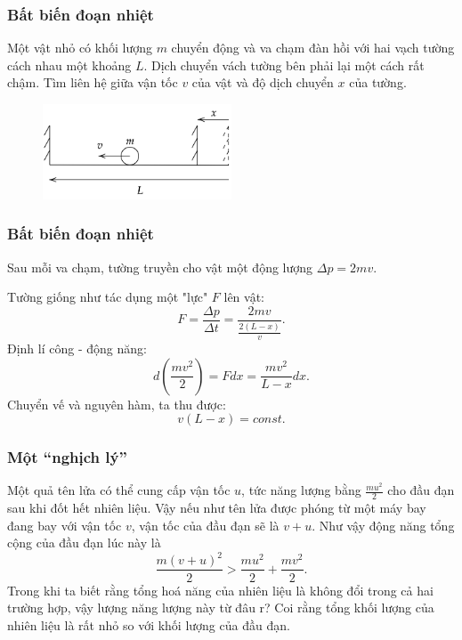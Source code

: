 \begin{frame}
\frametitle{Bất biến đoạn nhiệt}
Một vật nhỏ có khối lượng \(m\) chuyển động và va chạm đàn hồi với hai vạch tường cách nhau một khoảng \(L\). Dịch chuyển vách tường bên phải lại một cách rất chậm. Tìm liên hệ giữa vận tốc \(v\) của vật và độ dịch chuyển \(x\) của tường.
\begin{figure}
    \centering
    \includegraphics[width=0.5\textwidth]{Content/Figure/adiabatic.png}
\end{figure}
\end{frame}

\begin{frame}
\frametitle{Bất biến đoạn nhiệt}
Sau mỗi va chạm, tường truyền cho vật một động lượng \(\Delta p = 2mv\).

Tường giống như tác dụng một "lực" \(F\) lên vật:
\begin{equation*}
    F=\frac{\Delta p}{\Delta t}=\frac{2mv}{\frac{2(L-x)}{v}}.
\end{equation*}
Định lí công - động năng:
\begin{equation*}
    d\left(\frac{mv^2}{2}\right)=F dx=\frac{mv^2}{L-x}dx.
\end{equation*}
Chuyển vế và nguyên hàm, ta thu được:
\begin{equation}
    v(L-x)=const.
\end{equation}
\end{frame}
\begin{frame}
    \frametitle{Một ``nghịch lý''}
    Một quả tên lửa có thể cung cấp vận tốc \(u\), tức năng lượng bằng \(\frac{mu^2}{2}\) cho đầu đạn sau khi đốt hết nhiên liệu. Vậy nếu như tên lửa được phóng từ một máy bay đang bay
    với vận tốc \(v\), vận tốc của đầu đạn sẽ là \(v+u\). Như vậy động năng tổng cộng của đầu đạn lúc này là \[\frac{m(v+u)^2}{2}>\frac{mu^2}{2}+\frac{mv^2}{2}.\] Trong khi ta biết rằng tổng hoá năng của nhiên liệu là không đổi trong cả hai trường hợp, vậy lượng năng lượng này từ đâu r? 
    Coi rằng tổng khối lượng của nhiên liệu là rất nhỏ so với khối lượng của đầu đạn.
\end{frame}